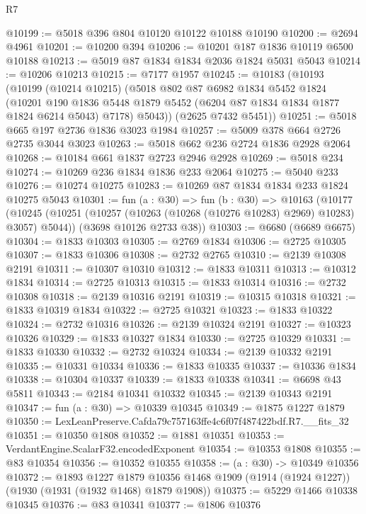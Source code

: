 \begin{lexlean}{R7}
\begin{coremodule}
@10199 := @5018 @396 @804 @10120 @10122 @10188 @10190
@10200 := @2694 @4961
@10201 := @10200 @394
@10206 := @10201 @187 @1836 @10119 @6500 @10188
@10213 := @5019 @87 @1834 @1834 @2036 @1824 @5031 @5043
@10214 := @10206 @10213
@10215 := @7177 @1957
@10245 := @10183
    (@10193
      (@10199
        (@10214 @10215)
        (@5018
          @802
          @87
          @6982
          @1834
          @5452
          @1824
          (@10201
            @190
            @1836
            @5448
            @1879
            @5452
            (@6204 @87 @1834 @1834 @1877 @1824 @6214 @5043)
            @7178)
          @5043))
      (@2625 @7432 @5451))
@10251 := @5018 @665 @197 @2736 @1836 @3023 @1984
@10257 := @5009 @378 @664 @2726 @2735 @3044 @3023
@10263 := @5018 @662 @236 @2724 @1836 @2928 @2064
@10268 := @10184 @661 @1837 @2723 @2946 @2928
@10269 := @5018 @234
@10274 := @10269 @236 @1834 @1836 @233 @2064
@10275 := @5040 @233
@10276 := @10274 @10275
@10283 := @10269 @87 @1834 @1834 @233 @1824 @10275 @5043
@10301 := fun (a : @30) =>
  fun (b : @30) =>
  @10163
    (@10177
      (@10245 (@10251 (@10257 (@10263 (@10268 (@10276 @10283) @2969) @10283) @3057) @5044))
      (@3698 @10126 @2733 @38))
@10303 := @6680 (@6689 @6675)
@10304 := @1833 @10303
@10305 := @2769 @1834
@10306 := @2725 @10305
@10307 := @1833 @10306
@10308 := @2732 @2765
@10310 := @2139 @10308 @2191
@10311 := @10307 @10310
@10312 := @1833 @10311
@10313 := @10312 @1834
@10314 := @2725 @10313
@10315 := @1833 @10314
@10316 := @2732 @10308
@10318 := @2139 @10316 @2191
@10319 := @10315 @10318
@10321 := @1833 @10319 @1834
@10322 := @2725 @10321
@10323 := @1833 @10322
@10324 := @2732 @10316
@10326 := @2139 @10324 @2191
@10327 := @10323 @10326
@10329 := @1833 @10327 @1834
@10330 := @2725 @10329
@10331 := @1833 @10330
@10332 := @2732 @10324
@10334 := @2139 @10332 @2191
@10335 := @10331 @10334
@10336 := @1833 @10335
@10337 := @10336 @1834
@10338 := @10304 @10337
@10339 := @1833 @10338
@10341 := @6698 @43 @5811
@10343 := @2184 @10341 @10332
@10345 := @2139 @10343 @2191
@10347 := fun (a : @30) => @10339 @10345
@10349 := @1875 @1227 @1879
@10350 := LexLeanPreserve.Cafda79c757163ffe4c6f07f487422bdf.R7.__fits_32
@10351 := @10350 @1808
@10352 := @1881 @10351
@10353 := VerdantEngine.ScalarF32.encodedExponent
@10354 := @10353 @1808
@10355 := @83 @10354
@10356 := @10352 @10355
@10358 := (a : @30) -> @10349 @10356
@10372 := @1893
    @1227
    @1879
    @10356
    @1468
    @1909
    (@1914 (@1924 @1227))
    (@1930 (@1931 (@1932 @1468) @1879 @1908))
@10375 := @5229 @1466 @10338 @10345
@10376 := @83 @10341
@10377 := @1806 @10376

\end{coremodule}
\end{lexlean}
